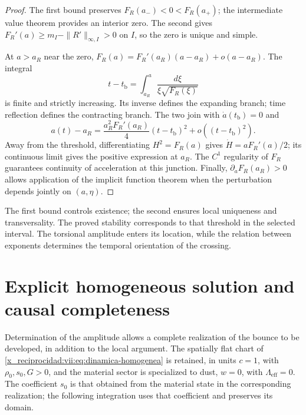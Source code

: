 \begin{proof}
The first bound preserves
\(F_R(a_-)<0<F_R(a_+)\); the intermediate value theorem provides
an interior zero. The second gives
\(F_R'(a)\geq m_I-\|R'\|_{\infty,I}>0\) on \(I\), so the zero
is unique and simple.

At \(a>a_R\) near the zero,
\(F_R(a)=F_R'(a_R)(a-a_R)+o(a-a_R)\).
The integral
\[
 t-t_{\mathrm b}=\int_{a_R}^{a}
          \frac{d\xi}{\xi\sqrt{F_R(\xi)}}
\]
is finite and strictly increasing. Its inverse defines the expanding
branch; time reflection defines the contracting branch.
The two join with \(\dot a(t_{\mathrm b})=0\) and
\[
 a(t)-a_R
 =\frac{a_R^2F_R'(a_R)}4(t-t_{\mathrm b})^2
   +o((t-t_{\mathrm b})^2).
\]
Away from the threshold, differentiating \(H^2=F_R(a)\) gives
\(\dot H=aF_R'(a)/2\); its continuous limit gives the positive expression
at \(a_R\). The \(C^1\) regularity of \(F_R\) guarantees continuity
of acceleration at this junction. Finally,
\(\partial_aF_R(a_R)>0\) allows application of the implicit function
theorem when the perturbation depends jointly on \((a,\eta)\).
\end{proof}

The first bound controls existence; the second ensures local
uniqueness and transversality. The proved stability corresponds to
that threshold in the selected interval. The torsional amplitude
enters its location, while the relation between
exponents determines the temporal orientation of the crossing.



\chapter{Explicit homogeneous solution and causal completeness}
\label{x_reciprocidad:vii:sec:solucion-homogenea}
Determination of the amplitude allows a complete realization
of the bounce to be developed, in addition to the local argument. The spatially
flat chart of \eqref{x_reciprocidad:vii:eq:dinamica-homogenea} is retained, in units
\(c=1\), with \(\rho_0,s_0,G>0\), and the material sector is specialized
to dust, \(w=0\), with \(\Lambda_{\mathrm{eff}}=0\).
The coefficient \(s_0\) is that obtained from the material
state in the corresponding realization; the following integration
uses that coefficient and preserves its domain.

